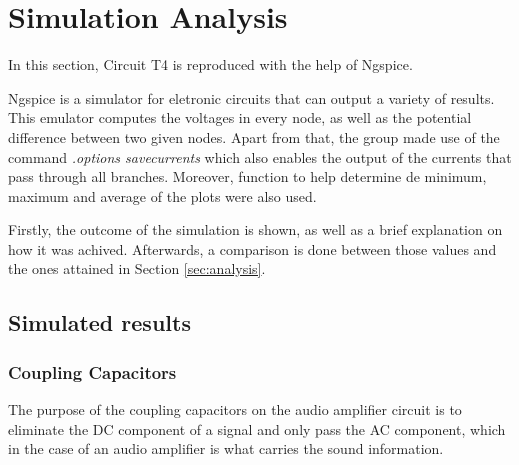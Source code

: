 
\section{Simulation Analysis}
\label{sec:simulation}



In this section, Circuit T4 is reproduced with the help of Ngspice.

Ngspice is a simulator for eletronic circuits that can output a variety of results.
This emulator computes the voltages in every node, as well as the potential difference
between two given nodes. Apart from that, the group made use of the command
{\em .options savecurrents} which also enables the output of the currents that pass
through all branches. Moreover, function to help determine de minimum, maximum and average
of the plots were also used.


Firstly, the outcome of the simulation is shown, as well as a brief explanation
on how it was achived. Afterwards, a comparison is done between those values and
the ones attained in Section \ref{sec:analysis}.




\subsection{Simulated results}
\label{subsec:sim_res}

\subsubsection{Coupling Capacitors}

The purpose of the coupling capacitors on the audio amplifier circuit is to eliminate the DC component of a signal and only pass the AC component, which in the case of an audio amplifier is what carries the sound information.

